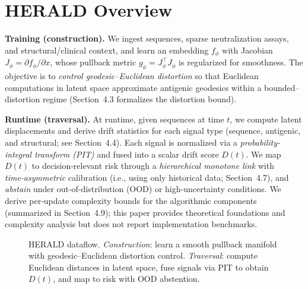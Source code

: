 \documentclass[11pt]{article}
\begin{document}
\section{HERALD Overview}

\textbf{Training (construction).}
We ingest sequences, sparse neutralization assays, and structural/clinical context, and learn an embedding $f_\phi$ with Jacobian $J_\phi=\partial f_\phi/\partial x$, whose pullback metric $g_\phi = J_\phi^{\top} J_\phi$ is regularized for smoothness. The objective is to \emph{control geodesic--Euclidean distortion} so that Euclidean computations in latent space approximate antigenic geodesics within a bounded--distortion regime (Section~4.3 formalizes the distortion bound).

\textbf{Runtime (traversal).}
At runtime, given sequences at time $t$, we compute latent displacements and derive drift statistics for each signal type (sequence, antigenic, and structural; see Section~4.4). Each signal is normalized via a \emph{probability-integral transform (PIT)} and fused into a scalar drift score $D(t)$. We map $D(t)$ to decision‑relevant risk through a \emph{hierarchical monotone link} with \emph{time‑asymmetric} calibration (i.e., using only historical data; Section~4.7), and \emph{abstain} under out‑of‑distribution (OOD) or high‑uncertainty conditions. We derive per‑update complexity bounds for the algorithmic components (summarized in Section~4.9); this paper provides theoretical foundations and complexity analysis but does not report implementation benchmarks.

\begin{figure}[H]
  \centering
  \caption{HERALD dataflow. \emph{Construction}: learn a smooth pullback manifold with geodesic--Euclidean distortion control. \emph{Traversal}: compute Euclidean distances in latent space, fuse signals via PIT to obtain $D(t)$, and map to risk with OOD abstention.}
  \label{fig:overview}
\end{figure}
\end{document}
